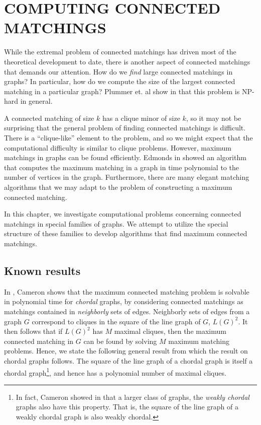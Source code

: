 \chapter{COMPUTING CONNECTED MATCHINGS}

While the extremal problem of connected matchings has driven most of the theoretical development to date, there is another aspect of connected matchings that demands our attention.  How do we {\it find} large connected matchings in graphs?  In particular, how do we compute the size of the largest connected matching in a particular graph?  Plummer et. al show in \cite{PST} that this problem is NP-hard in general.

A connected matching of size $k$ has a clique minor of size $k$, so it may not be surprising that the general problem of finding connected matchings is difficult.  There is a ``clique-like'' element to the problem, and so we might expect that the computational difficulty is similar to clique problems.  However, maximum matchings in graphs can be found efficiently.  Edmonds in \cite{edmonds} showed an algorithm that computes the maximum matching in a graph in time polynomial to the number of vertices in the graph.  Furthermore, there are many elegant matching algorithms that we may adapt to the problem of constructing a maximum connected matching.

In this chapter, we investigate computational problems concerning connected matchings in special families of graphs.  We attempt to utilize the special structure of these families to develop algorithms that find maximum connected matchings.

\section{Known results}

In \cite{K_Cam_conn_match}, Cameron shows that the maximum connected matching problem is solvable in polynomial time for {\it chordal} graphs,   
%
by considering connected matchings as matchings contained in {\it neighborly} sets of edges.  
%
Neighborly sets of edges from a graph $G$ correspond to cliques in the square of the line graph of $G$, $L(G)^2$.  
%
It then follows that if $L(G)^2$ has $M$ maximal cliques, then the maximum connected matching in $G$ can be found by solving $M$ maximum matching problems.  
%
Hence, we state the following general result from which the result on chordal graphs follows.
%
%
The square of the line graph of a chordal graph is itself a chordal graph\footnote{In fact, Cameron showed in \cite{indmatch} that a larger class of graphs, the {\it weakly chordal} graphs also have this property.  That is, the square of the line graph of a weakly chordal graph is also weakly chordal.}, and hence has a polynomial number of maximal cliques. 
%

